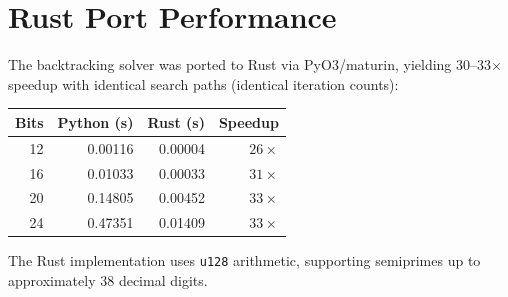 \documentclass[11pt,a4paper]{article}
\begin{document}
\section{Rust Port Performance}
\label{app:rust}

The backtracking solver was ported to Rust via PyO3/maturin, yielding 30--33$\times$ speedup with identical search paths (identical iteration counts):

\begin{table}[h]
\centering
\begin{tabular}{@{}rrrr@{}}
\toprule
Bits & Python (s) & Rust (s) & Speedup \\
\midrule
12 & 0.00116 & 0.00004 & $26\times$ \\
16 & 0.01033 & 0.00033 & $31\times$ \\
20 & 0.14805 & 0.00452 & $33\times$ \\
24 & 0.47351 & 0.01409 & $33\times$ \\
\bottomrule
\end{tabular}
\end{table}

The Rust implementation uses \texttt{u128} arithmetic, supporting semiprimes up to approximately 38 decimal digits.
\end{document}
